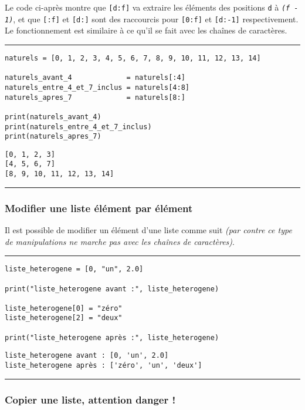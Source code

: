 Le code ci-après montre que \texttt{[d:f]} va extraire les éléments des positions \texttt{d} à \texttt{\textit{(f - 1)}}, et que \texttt{[:f]} et \texttt{[d:]} sont des raccourcis pour \texttt{[0:f]} et \texttt{[d:-1]} respectivement. Le fonctionnement est similaire à ce qu'il se fait avec les chaînes de caractères.


\bigskip
{\hrule height .5mm}
\begin{verbatim}
naturels = [0, 1, 2, 3, 4, 5, 6, 7, 8, 9, 10, 11, 12, 13, 14]

naturels_avant_4             = naturels[:4]
naturels_entre_4_et_7_inclus = naturels[4:8]
naturels_apres_7             = naturels[8:]

print(naturels_avant_4)
print(naturels_entre_4_et_7_inclus)
print(naturels_apres_7)
\end{verbatim}
 \color{ForestGreen}
\vspace{-1.5em}
\begin{verbatim}
[0, 1, 2, 3]
[4, 5, 6, 7]
[8, 9, 10, 11, 12, 13, 14]
\end{verbatim} \color{Black}
{\hrule height .5mm}
\bigskip


\subsubsection{Modifier une liste élément par élément}

Il est possible de modifier un élément d'une liste comme suit \textit{(par contre ce type de manipulations ne marche pas avec les chaînes de caractères)}.


\bigskip
{\hrule height .5mm}
\begin{verbatim}
liste_heterogene = [0, "un", 2.0]

print("liste_heterogene avant :", liste_heterogene)

liste_heterogene[0] = "zéro"
liste_heterogene[2] = "deux"

print("liste_heterogene après :", liste_heterogene)
\end{verbatim}
 \color{ForestGreen}
\vspace{-1.5em}
\begin{verbatim}
liste_heterogene avant : [0, 'un', 2.0]
liste_heterogene après : ['zéro', 'un', 'deux']
\end{verbatim} \color{Black}
{\hrule height .5mm}
\bigskip


\subsubsection{Copier une liste, attention danger !}

